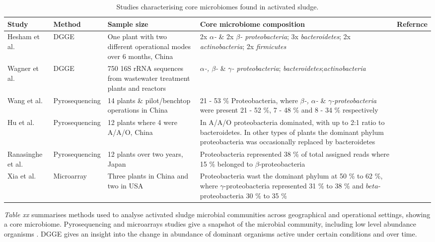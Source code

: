 \documentclass[11pt]{article}
\begin{document}
\begin{sidewaystable}[!htbp]
\caption{Studies characterising core microbiomes found in activated sludge.}
\begin{tabular}{ | l | l | p{4.5cm} | p{7cm} | l | }
\hline
Study & Method & Sample size & Core microbiome composition & Refernce\\
\hline
Hesham et al. & DGGE & One plant with two different operational modes over 6 months, China & 2x \emph{$\alpha$-} \& 2x \emph{$\beta$- proteobacteria}; 3x \emph{bacteroidetes}; 2x \emph{actinobacteria}; 2x \emph{firmicutes} & \cite{Hesham_11} \\
\hline
Wagner et al. & DGGE & 750 16S rRNA sequences from wastewater treatment plants and reactors & \emph{$\alpha$-, $\beta$-} \& \emph{$\gamma$- proteobacteria}; \emph{bacteroidetes};\emph{actinobacteria} & \cite{Wagner_02} \\
\hline
Wang et al. & Pyrosequencing & 14 plants \& pilot/benchtop operations in China & 21 - 53 \% Proteobacteria, where \emph{$\beta$-, $\alpha$-} \& \emph{$\gamma$-proteobacteria} were present 21 - 52 \%, 7 - 48 \% and 8 - 34 \% respectively & \cite{wang2012pyrosequencing} \\
\hline
Hu et al. & Pyrosequencing & 12 plants where 4 were A/A/O, China & In A/A/O proteobacteria dominated, with up to 2:1 ratio to bacteroidetes. In other types of plants the dominant phylum proteobacteria was occasionally replaced by bacteroidetes & \cite{hu2012microbial} \\
\hline
Ranasinghe et al. & Pyrosequencing & 12 plants over two years, Japan & Proteobacteria represented 38 \% of total assigned reads where 15 \% belonged to $\beta$-proteobacteria & \cite{ranasinghe2012revealing} \\
\hline
Xia et al. & Microarray & Three plants in China and two in USA & Proteobacteria wast the dominant phylum at 50 \% to 62 \%, where $\gamma$-proteobacteria represented  31 \% to 38 \% and $beta$-proteobacteria 30 \% to 35 \% & \cite{xia2010bacterial} \\
\hline
\end{tabular}
\end{sidewaystable}


\emph{Table xx} summarises methods used to analyse activated sludge microbial communities across geographical and operational settings, showing a core microbiome. Pyrosequencing and microarrays studies give a snapshot of the microbial community, including low level abundance organisms \cite{ranasinghe2012revealing}. DGGE gives an insight into the change in abundance of dominant organisms active under certain conditions and over time. 
\FloatBarrier
\end{document}
